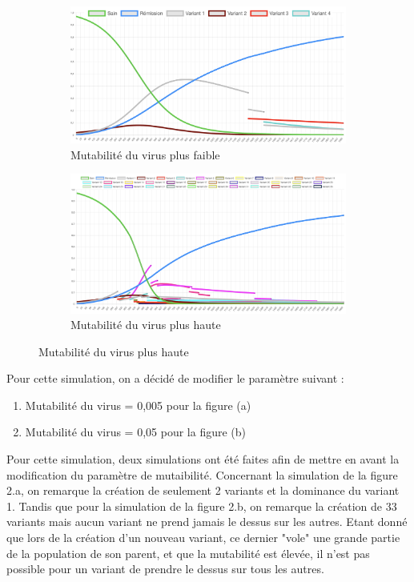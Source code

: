 \documentclass{article}
\begin{document}
\begin{figure}[h]
  \begin{subfigure}{.5\textwidth}
  \centering
  \includegraphics[width=1\linewidth]{images/Simulation2_1.png}
  \caption{Mutabilité du virus plus faible}
  \label{fig:sub1}
\end{subfigure}%
\begin{subfigure}{.5\textwidth}
  \centering
  \includegraphics[width=1\linewidth]{images/Simulation2_2.png}
  \caption{Mutabilité du virus plus haute}
  \label{fig:sub2}
\end{subfigure}
\end{figure}

Pour cette simulation, on a décidé de modifier le paramètre suivant :
\begin{enumerate}
    \item Mutabilité du virus = 0,005 pour la figure (a)
    \item Mutabilité du virus = 0,05 pour la figure (b) \\
\end{enumerate}

\noindent
Pour cette simulation, deux simulations ont été faites afin de mettre en avant la modification du paramètre de mutaibilité. Concernant la simulation de la figure 2.a, on remarque la création de seulement 2 variants et la dominance du variant 1. Tandis que pour la simulation de la figure 2.b, on remarque la création de 33 variants mais aucun variant ne prend jamais le dessus sur les autres. Etant donné que lors de la création d'un nouveau variant, ce dernier "vole" une grande partie de la population de son parent, et que la mutabilité est élevée, il n'est pas possible pour un variant de prendre le dessus sur tous les autres.
\end{document}

